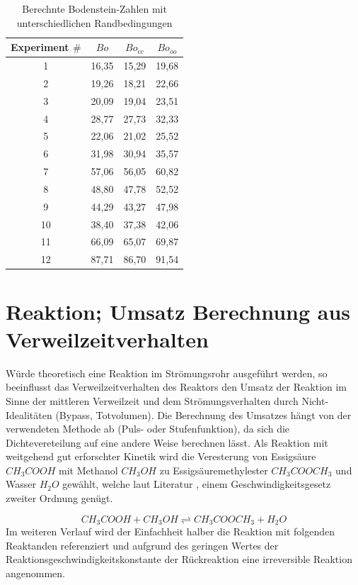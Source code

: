 \documentclass[12pt,liststotoc]{report}
\begin{document}
\begin{table}[H]
\centering
\caption{Berechnte Bodenstein-Zahlen mit unterschiedlichen Randbedingungen}
\begin{tabular}{cccc}
\toprule 
Experiment $\#$ & $Bo$ & $Bo_{cc}$ & $Bo_{oo}$\\
\midrule
1 & 16,35 & 15,29 & 19,68 \\
2 & 19,26 & 18,21 & 22,66 \\
3 & 20,09 & 19,04 & 23,51 \\
4 & 28,77 & 27,73 & 32,33 \\
5 & 22,06 & 21,02 & 25,52 \\
6 & 31,98 & 30,94 & 35,57 \\
7 & 57,06 & 56,05 & 60,82 \\
8 & 48,80 & 47,78 & 52,52 \\
9 & 44,29 & 43,27 & 47,98 \\
10 & 38,40 & 37,38 & 42,06 \\
11 & 66,09 & 65,07 & 69,87 \\
12 & 87,71 & 86,70 & 91,54 \\
\bottomrule
\end{tabular}
\label{tab:BodensteinDispersion}
\end{table}
\noindent



\section{Reaktion; Umsatz Berechnung aus Verweilzeitverhalten}

Würde theoretisch eine Reaktion im Strömungsrohr ausgeführt werden, so beeinflusst das Verweilzeitverhalten des Reaktors den Umsatz der Reaktion im Sinne der mittleren Verweilzeit und dem  Strömungsverhalten durch Nicht-Idealitäten (Bypass, Totvolumen). Die Berechnung des Umsatzes hängt von der verwendeten Methode ab (Puls- oder Stufenfunktion), da sich die Dichtevereteilung auf eine andere Weise berechnen lässt. Als Reaktion mit weitgehend gut erforschter Kinetik wird die Veresterung von Essigsäure $CH_3COOH$ mit Methanol $CH_3OH$ zu Essigsäuremethylester $CH_3COOCH_3$ und Wasser $H_2O$ gewählt, welche laut Literatur \cite{Rolfe1934}, \cite{mandake2013kinetic} einem Geschwindigkeitsgesetz zweiter Ordnung genügt.

\begin{equation*}
 CH_3COOH + CH_3OH \rightleftharpoons CH_3COOCH_3 + H_2O 
\end{equation*}
\noindent
Im weiteren Verlauf wird der Einfachheit halber die Reaktion mit folgenden Reaktanden referenziert und aufgrund des geringen Wertes der Reaktionsgeschwindigkeitskonstante der Rückreaktion eine irreversible Reaktion angenommen.
\end{document}
